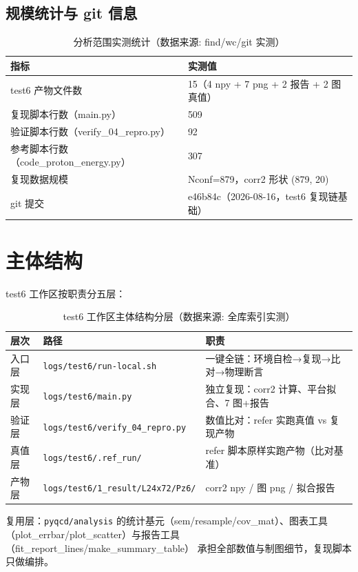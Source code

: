 \documentclass[UTF8]{ctexart}
\begin{document}
\subsection{规模统计与 git 信息}
\begin{table}[htbp]\centering
\begin{tabular}{ll}
\toprule
指标 & 实测值 \\
\midrule
test6 产物文件数 & 15（4 npy + 7 png + 2 报告 + 2 图真值） \\
复现脚本行数（main.py） & 509 \\
验证脚本行数（verify\_04\_repro.py） & 92 \\
参考脚本行数（code\_proton\_energy.py） & 307 \\
复现数据规模 & Nconf=879，corr2 形状 (879, 20) \\
git 提交 & e46b84c（2026-08-16，test6 复现链基础） \\
\bottomrule
\end{tabular}
\caption{分析范围实测统计（数据来源: find/wc/git 实测）}
\end{table}

\section{主体结构}
test6 工作区按职责分五层：
\begin{table}[htbp]\centering
\begin{tabularx}{\textwidth}{llX}
\toprule
\textcolor{struct}{层次} & 路径 & \textcolor{struct}{职责} \\
\midrule
入口层 & \texttt{logs/test6/run-local.sh} & 一键全链：环境自检→复现→比对→物理断言 \\
实现层 & \texttt{logs/test6/main.py} & 独立复现：corr2 计算、平台拟合、7 图+报告 \\
验证层 & \texttt{logs/test6/verify\_04\_repro.py} & 数值比对：refer 实跑真值 vs 复现产物 \\
真值层 & \texttt{logs/test6/.ref\_run/} & refer 脚本原样实跑产物（比对基准） \\
产物层 & \texttt{logs/test6/1\_result/L24x72/Pz6/} & corr2 npy / 图 png / 拟合报告 \\
\bottomrule
\end{tabularx}
\caption{test6 工作区主体结构分层（数据来源: 全库索引实测）}
\end{table}

复用层：\texttt{pyqcd/analysis} 的统计基元（sem/resample/cov\_mat）、图表工具
（plot\_errbar/plot\_scatter）与报告工具（fit\_report\_lines/make\_summary\_table）
承担全部数值与制图细节，复现脚本只做编排。
\end{document}
